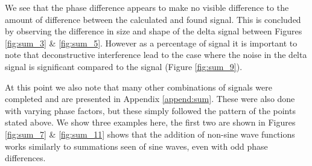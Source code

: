 We see that the phase difference appears to make no visible difference to the amount of difference between the calculated and found signal. This is concluded by observing the difference in size and shape of the delta signal between Figures \ref{fig:sum_3} \& \ref{fig:sum_5}. However as a percentage of signal it is important to note that deconstructive interference lead to the case where the noise in the delta signal is significant compared to the signal (Figure \ref{fig:sum_9}). 
\newline

At this point we also note that many other combinations of signals were completed and are presented in Appendix \ref{append:sum}. These were also done with varying phase factors, but these simply followed the pattern of the points stated above. We show three examples here, the first two are shown in Figures \ref{fig:sum_7} \& \ref{fig:sum_11} shows that the addition of non-sine wave functions works similarly to summations seen of sine waves, even with odd phase differences.
